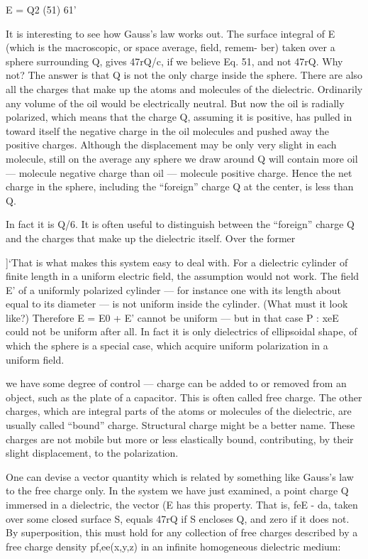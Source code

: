 {{\begin{equation}
\end{equation}
E = Q2 (51)
61'

It is interesting to see how Gauss's law works out. The surface integral
of E (which is the macroscopic, or space average, field, remem-
ber) taken over a sphere surrounding Q, gives 47rQ/c, if we believe
Eq. 51, and not 47rQ. Why not? The answer is that Q is not the only
charge inside the sphere. There are also all the charges that make up
the atoms and molecules of the dielectric. Ordinarily any volume
of the oil would be electrically neutral. But now the oil is radially
polarized, which means that the charge Q, assuming it is positive, has
pulled in toward itself the negative charge in the oil molecules and
pushed away the positive charges. Although the displacement may
be only very slight in each molecule, still on the average any sphere
we draw around Q will contain more oil --- molecule negative charge
than oil --- molecule positive charge. Hence the net charge in the
sphere, including the ``foreign'' charge Q at the center, is less than Q.

In fact it is Q/6.
It is often useful to distinguish between the ``foreign'' charge Q
and the charges that make up the dielectric itself. Over the former

]‘That is what makes this system easy to deal with. For a dielectric cylinder of
finite length in a uniform electric field, the assumption would not work. The field E'
of a uniformly polarized cylinder --- for instance one with its length about equal to its
diameter --- is not uniform inside the cylinder. (What must it look like?) Therefore
E = E0 + E' cannot be uniform --- but in that case P : xeE could not be uniform after
all. In fact it is only dielectrics of ellipsoidal shape, of which the sphere is a special
case, which acquire uniform polarization in a uniform field.

we have some degree of control --- charge can be added to or removed
from an object, such as the plate of a capacitor. This is often called
free charge. The other charges, which are integral parts of the atoms
or molecules of the dielectric, are usually called ``bound'' charge.
Structural charge might be a better name. These charges are not
mobile but more or less elastically bound, contributing, by their
slight displacement, to the polarization.

One can devise a vector quantity which is related by something
like Gauss's law to the free charge only. In the system we have just
examined, a point charge Q immersed in a dielectric, the vector (E
has this property. That is, feE - da, taken over some closed surface S,
equals 47rQ if S encloses Q, and zero if it does not. By superposition,
this must hold for any collection of free charges described by a free
charge density pf,ee(x,y,z) in an infinite homogeneous dielectric
medium:

}}
